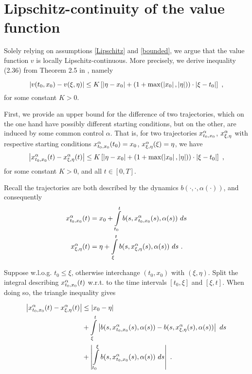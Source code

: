 \section{Lipschitz-continuity of the value function}
\label{value lipschitz}

Solely relying on assumptions \eqref{Lipschitz} and \eqref{bounded}, we argue that the value function $ v $ is locally Lipschitz-continuous. More precisely, we derive inequality (2.36) from Theorem 2.5 in \cite[p.~165]{zhou}, namely

\begin{equation}
	\label{loc lipschitz}
	\left\lvert {v(t_0, x_0)- v(\xi, \eta)} \right\rvert \leq K \left[\left\lvert {\eta - x_0} \right\rvert + (1 + \max(\left\lvert {x_0} \right\rvert, \left\lvert {\eta} \right\rvert)) \cdot \left\lvert {\xi - t_0} \right\rvert \right] \ ,
\end{equation}
for some constant $ K > 0 $. 

First, we provide an upper bound for the difference of two trajectories, which on the one hand have possibly different starting conditions, but on the other, are induced by some common control $ \alpha $. That is, for two trajectories $ x_{t_0, x_0}^{\alpha} $, $ x_{\xi, \eta}^{\alpha} $ with respective starting conditions $ x_{t_0, x_0}^{\alpha}(t_0) = x_0 $, $ x_{\xi, \eta}^{\alpha}(\xi) = \eta $, we have
\begin{equation}
	\label{general gronwall}
	\left\lvert {x_{t_0, x_0}^{\alpha}(t) - x_{\xi, \eta}^{\alpha}(t)} \right\rvert \leq K \left[\left\lvert {\eta - x_0} \right\rvert + (1 + \max(\left\lvert {x_0} \right\rvert, \left\lvert {\eta} \right\rvert)) \cdot \left\lvert {\xi - t_0} \right\rvert \right] \ ,
\end{equation}
for some constant $ K > 0 $, and all $ t \in \left[0, T\right] $.

Recall the trajectories are both described by the dynamics $ b(\cdot, \cdot, \alpha(\cdot)) $, and consequently
\begin{align*}
	x_{t_0, x_0}^{\alpha}(t) &= x_0 + \int\limits_{t_0}^{t} b(s, x_{t_0, x_0}^{\alpha}(s), \alpha(s)) \ ds \\
	x_{\xi, \eta}^{\alpha}(t) &= \eta + \int\limits_{\xi}^{t} b(s, x_{\xi, \eta}^{\alpha}(s), \alpha(s)) \ ds \ .
\end{align*}

Suppose w.l.o.g. $ t_0 \leq \xi $, otherwise interchange $ (t_0, x_0) $ with $ (\xi, \eta) $. Split the integral describing $ x_{t_0, x_0}^{\alpha}(t) $ w.r.t. to the time intervals $ \left[t_0, \xi \right] $ and $ \left[\xi, t\right] $. When doing so, the triangle inequality gives

\begin{equation*}
	\begin{split}
	\left\lvert {x_{t_0, x_0}^{\alpha}(t) - x_{\xi, \eta}^{\alpha}(t)} \right\rvert &\leq \left\lvert {x_0 - \eta } \right\rvert \\
	&+ \int\limits_{\xi}^{t} \left\lvert {b(s, x_{t_0, x_0}^{\alpha}(s), \alpha(s)) - b(s, x_{\xi, \eta}^{\alpha}(s), \alpha(s))} \right\rvert \ ds \\
	&+ \left\lvert {\int\limits_{t_0}^{\xi} b(s, x_{t_0, x_0}^{\alpha}(s), \alpha(s)) \ ds} \right\rvert\ .
	\end{split}
\end{equation*}

